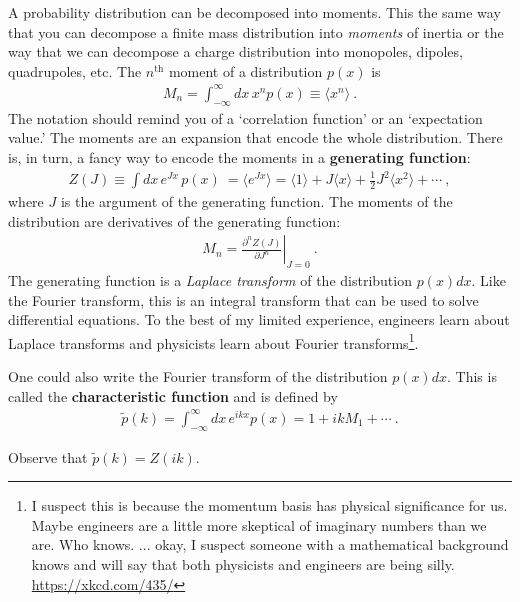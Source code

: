 A probability distribution can be decomposed into moments. This the same way that you can decompose a finite mass distribution into \emph{moments} of inertia or the way that we can decompose a charge distribution into monopoles, dipoles, quadrupoles, etc. The $n^\text{th}$ moment of a distribution $p(x)$ is
\begin{align}
	M_n = \int_{-\infty}^\infty dx \, x^n p(x) \equiv \langle x^n \rangle \ .
\end{align}
The notation should remind you of a `correlation function' or an `expectation value.' The moments are an expansion that encode the whole distribution. There is, in turn, a fancy way to encode the moments in a \textbf{generating function}:
\begin{align}
	Z(J) \equiv \int dx\, e^{J x} \, p(x) \  
	= \langle e^{J x}\rangle
	= \langle 1 \rangle + J \langle x\rangle
	+ \frac{1}{2}J^2 \langle x^2\rangle + \cdots \ ,
	\label{eq:generating:function}
\end{align}
where $J$ is the argument of the generating function. The moments of the distribution are derivatives of the generating function:
\begin{align}
	M_n =
	\left.\frac{\partial^n Z(J)}{\partial J^n}\right|_{J = 0} \ .
\end{align}
The generating function is a \emph{Laplace transform} of the distribution $p(x)dx$. Like the Fourier transform, this is an integral transform that can be used to solve differential equations. To the best of my limited experience, engineers learn about Laplace transforms and physicists learn about Fourier transforms\footnote{I suspect this is because the momentum basis has physical significance for us. Maybe engineers are a little more skeptical of imaginary numbers than we are. Who knows. ... okay, I suspect someone with a mathematical background knows and will say that both physicists and engineers are being silly. \url{https://xkcd.com/435/}}.
\begin{example}
One could also write the Fourier transform of the distribution $p(x)dx$. This is called the \textbf{characteristic function} and is defined by
\begin{align}
	\tilde p(k) = \int_{-\infty}^\infty dx\, e^{ikx}p(x) = 1 + ikM_1 + \cdots \ .
\end{align}
\end{example}

\begin{example}
Observe that $\tilde p(k) = Z(ik)$.
\end{example}

